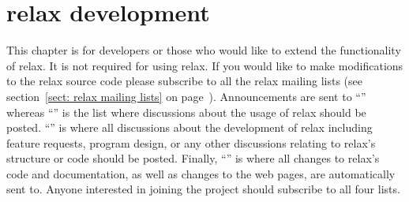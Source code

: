 


\chapter{relax development} \label{ch: relax devel}

This chapter is for developers or those who would like to extend the functionality of relax.
It is not required for using relax.
If you would like to make modifications to the relax source code please subscribe to all the relax mailing lists (see section~\ref{sect: relax mailing lists} on page~\pageref{sect: relax mailing lists}).
Announcements are sent to ``\relaxAnnounceML'' whereas ``\relaxUsersML'' is the list where discussions about the usage of relax should be posted.
``\relaxDevelML'' is where all discussions about the development of relax including feature requests, program design, or any other discussions relating to relax's structure or code should be posted.
Finally, ``\relaxCommitsML'' is where all changes to relax's code and documentation, as well as changes to the web pages, are automatically sent to.
Anyone interested in joining the project should subscribe to all four lists.



